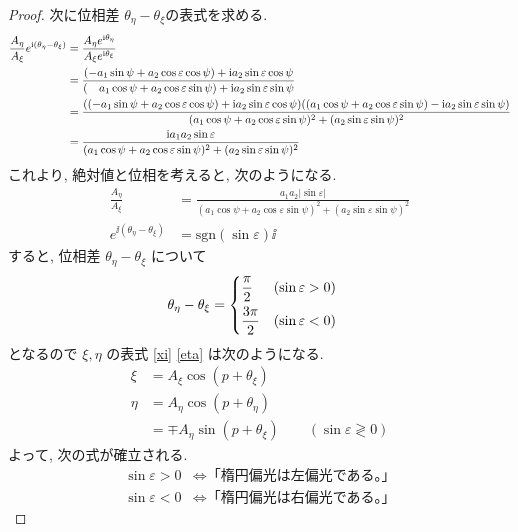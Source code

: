 \documentclass[a4paper,dvipdfmx]{jsarticle}
\theoremstyle{definition}
\begin{document}
\begin{proof}
  次に位相差 $\theta_\eta - \theta_\xi$の表式を求める.
  \begin{align}
    \frac{A_\eta}{A_\xi}e^{\mathrm{i}(\theta_\eta - \theta_\xi)}
     & = \frac{A_\eta e^{\mathrm{i}\theta_\eta}}{A_\xi e^{\mathrm{i}\theta_\xi}}                                                                                                                                                                                                 \\
     & = \frac{(-a_1\sin\psi + a_2\cos\varepsilon\cos\psi) + \mathrm{i} a_2\sin\varepsilon\cos\psi}{(\quad a_1\cos\psi + a_2\cos\varepsilon\sin\psi) + \mathrm{i} a_2\sin\varepsilon\sin\psi}                                                                                    \\
     & = \frac{\qty((-a_1\sin\psi + a_2\cos\varepsilon\cos\psi) + \mathrm{i} a_2\sin\varepsilon\cos\psi)\qty((a_1\cos\psi + a_2\cos\varepsilon\sin\psi) - \mathrm{i} a_2\sin\varepsilon\sin\psi)}{(a_1\cos\psi + a_2\cos\varepsilon\sin\psi)^2 + (a_2\sin\varepsilon\sin\psi)^2} \\
     & = \frac{\mathrm{i} a_1a_2\sin\varepsilon}{(a_1\cos\psi + a_2\cos\varepsilon\sin\psi)^2 + (a_2\sin\varepsilon\sin\psi)^2}
  \end{align}
  これより, 絶対値と位相を考えると, 次のようになる.
  \begin{align}
    \frac{A_\eta}{A_\xi}              & = \frac{a_1a_2\lvert\sin\varepsilon\rvert}{(a_1\cos\psi + a_2\cos\varepsilon\sin\psi)^2 + (a_2\sin\varepsilon\sin\psi)^2} \\
    e^{\ii(\theta_\eta - \theta_\xi)} & = \mathrm{sgn}(\sin\varepsilon)\ii
  \end{align}
  すると, 位相差 $\theta_\eta - \theta_\xi$ について
  \begin{align}
    \theta_\eta - \theta_\xi & =
    \begin{dcases}
      \frac{\pi}{2}  & (\sin\varepsilon > 0) \\
      \frac{3\pi}{2} & (\sin\varepsilon < 0)
    \end{dcases}
  \end{align}
  となるので $\xi, \eta$ の表式 \eqref{xi} \eqref{eta} は次のようになる.
  \begin{align}
    \xi  & = A_\xi\cos(p + \theta_\xi)                                          \\
    \eta & = A_\eta\cos(p + \theta_\eta)                                        \\
         & = \mp A_\eta\sin(p + \theta_\xi) \qquad (\sin\varepsilon \gtrless 0)
  \end{align}
  よって, 次の式が確立される.
  \begin{align}
    \sin\varepsilon > 0 & \iff \textrm{「楕円偏光は左偏光である。」} \\
    \sin\varepsilon < 0 & \iff \textrm{「楕円偏光は右偏光である。」}
  \end{align}
\end{proof}
\end{document}
